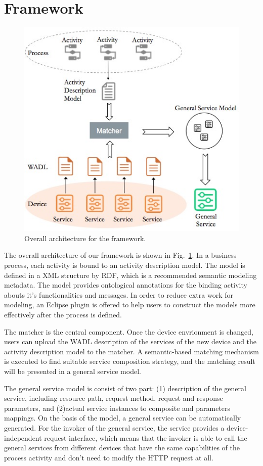 \section{Framework}
\label{Framework}
\begin{figure}[!t]
\centering
\includegraphics[width=1.0\linewidth]{./graph/framework}
\caption{Overall architecture for the framework.}
\label{fig_framework}
\end{figure}
The overall architecture of our framework is shown in Fig.~\ref{fig_framework}. In a business process, each activity is bound to an activity description model. The model is defined in a XML structure by RDF, which is a recommended semantic modeling metadata. The model provides ontological annotations for the binding activity abouts it's functionalities and messages. In order to reduce extra work for modeling, an Eclipse plugin is offered to help users to construct the models more effectively after the process is  defined. 

The matcher is the central component. Once the device envrionment is changed, users can upload the WADL description of the services of the new device and the activity description model to the matcher. A semantic-based matching mechanism is executed to find suitable service composition strategy, and the matching result will be presented in a general service model. 

The general service model is consist of two part: (1) description of the general service, including resource path, request method, request and response parameters, and (2)actual service instances to composite and parameters mappings. On the basis of the model, a general service can be automatically generated. For the invoker of the general service, the service provides a device-independent request interface, which means that the invoker is able to call the general services from different devices that have the same capabilities of the process activity and don't need to modify the HTTP request at all. 